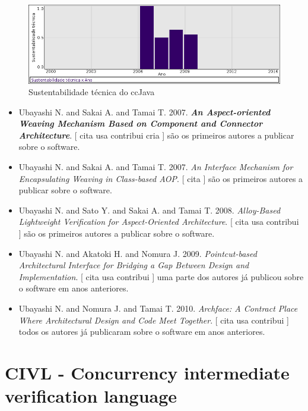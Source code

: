 \begin{figure}[h]
  \center
  \includegraphics[scale=0.50]{imagens/softwares-charts/ccjava.png}
  \caption{Sustentabilidade técnica do ccJava}
\end{figure}


\begin{itemize}
\item Ubayashi N. and Sakai A. and Tamai T.
      2007.
        \textbf{\textit{ An Aspect-oriented Weaving Mechanism Based on Component and Connector Architecture}}.
      [
          cita
          usa
          contribui
          cria
      ]
são os primeiros autores a publicar sobre o software.
\item Ubayashi N. and Sakai A. and Tamai T.
      2007.
        \textit{ An Interface Mechanism for Encapsulating Weaving in Class-based AOP}.
      [
          cita
      ]
são os primeiros autores a publicar sobre o software.
\item Ubayashi N. and Sato Y. and Sakai A. and Tamai T.
      2008.
        \textit{ Alloy-Based Lightweight Verification for Aspect-Oriented Architecture}.
      [
          cita
          usa
          contribui
      ]
são os primeiros autores a publicar sobre o software.
\item Ubayashi N. and Akatoki H. and Nomura J.
      2009.
        \textit{ Pointcut-based Architectural Interface for Bridging a Gap Between Design and Implementation}.
      [
          cita
          usa
          contribui
      ]
uma parte dos autores já publicou sobre o software em anos anteriores.
\item Ubayashi N. and Nomura J. and Tamai T.
      2010.
        \textit{ Archface: A Contract Place Where Architectural Design and Code Meet Together}.
      [
          cita
          usa
          contribui
      ]
todos os autores já publicaram sobre o software em anos anteriores.
\end{itemize}
\section{CIVL - Concurrency intermediate verification language}

